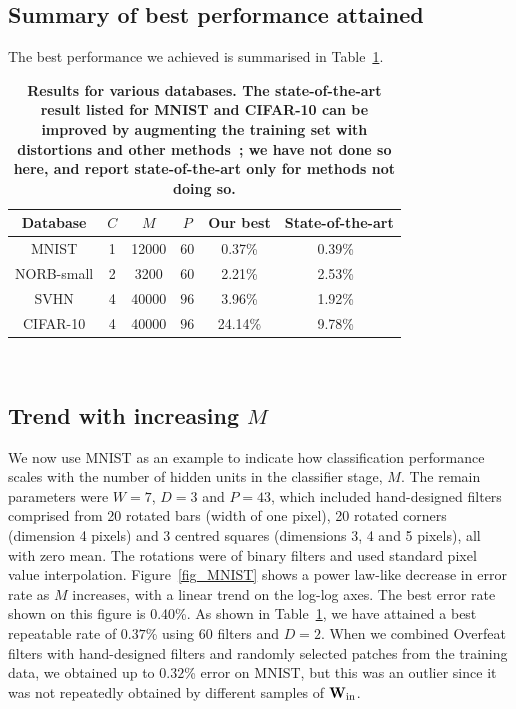 \documentclass[conference]{IEEEtran}
\begin{document}
\subsection{Summary of best performance attained}

The best performance we achieved is summarised in Table~\ref{Table4}. 

\begin{table}[!ht]
{\footnotesize
\begin{tabular}{|c|c|c|c|c|c|}
\hline
Database  & $C$ & $M$ & $P$& Our best & State-of-the-art\\
\hline
MNIST & 1& 12000  & 60 & 0.37\% & 0.39\%~\cite{Mairal.14,Lee.14}\\
NORB-small & 2&  3200 & $60$ & 2.21\% & 2.53\%~\cite{Ciresan.11}\\
SVHN  &  4& 40000 & $96$ & 3.96\%& 1.92\%~\cite{Lee.14}\\
CIFAR-10 &   4& 40000 & $96$ & 24.14\% & 9.78\%~\cite{Lee.14}\\ 
\hline
\end{tabular}
~\\
\caption{\bf{Results for various databases. The state-of-the-art result listed for MNIST and CIFAR-10 can be improved by augmenting the training set with distortions and other methods~\cite{Simard.03,Ciresan.10,Ciresan.12}; we have not done so here, and report state-of-the-art only for methods not doing so.}}\label{Table4}
}
\end{table}%

\subsection{Trend with increasing $M$}

We now use MNIST as an example to indicate how classification performance scales with the number of hidden units in the classifier stage, $M$. The remain parameters were $W=7$, $D=3$ and $P=43$, which included hand-designed filters comprised from 20 rotated bars (width of one pixel), 20 rotated corners (dimension 4 pixels) and 3 centred squares (dimensions 3, 4 and 5 pixels), all with  zero mean. The rotations were of binary filters and used standard pixel value interpolation. Figure~\ref{fig_MNIST} shows a power law-like decrease in error rate as $M$ increases, with a linear trend on the log-log axes. The best error rate shown on this figure is 0.40\%. As shown in Table~\ref{Table4}, we have attained a best repeatable rate of $0.37$\% using 60 filters and $D=2$. When we combined Overfeat filters with hand-designed filters and randomly selected patches from the training data, we obtained up to $0.32$\% error on MNIST, but this was an outlier since it was not repeatedly obtained by different samples of ${\bf W}_{\rm in}$.
\end{document}

